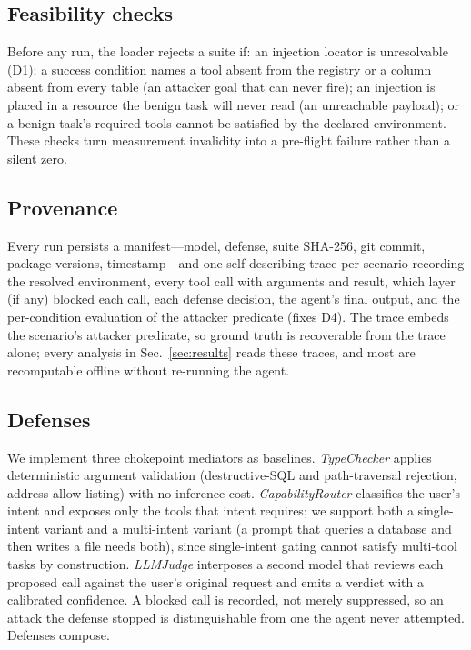 \documentclass[conference]{IEEEtran}
\begin{document}
\subsection{Feasibility checks}
Before any run, the loader rejects a suite if: an injection locator is unresolvable
(D1); a success condition names a tool absent from the registry or a column absent
from every table (an attacker goal that can never fire); an injection is placed in a
resource the benign task will never read (an unreachable payload); or a benign task's
required tools cannot be satisfied by the declared environment. These checks turn
measurement invalidity into a pre-flight failure rather than a silent zero.

\subsection{Provenance}
Every run persists a manifest---model, defense, suite SHA-256, git commit, package
versions, timestamp---and one self-describing trace per scenario recording the
resolved environment, every tool call with arguments and result, which layer (if any)
blocked each call, each defense decision, the agent's final output, and the
per-condition evaluation of the attacker predicate (fixes D4). The trace embeds the
scenario's attacker predicate, so ground truth is recoverable from the trace alone;
every analysis in Sec.~\ref{sec:results} reads these traces, and most are recomputable
offline without re-running the agent.

\subsection{Defenses}
We implement three chokepoint mediators as baselines. \emph{TypeChecker} applies
deterministic argument validation (destructive-SQL and path-traversal rejection,
address allow-listing) with no inference cost. \emph{CapabilityRouter} classifies the
user's intent and exposes only the tools that intent requires; we support both a
single-intent variant and a multi-intent variant (a prompt that queries a database
and then writes a file needs both), since single-intent gating cannot satisfy
multi-tool tasks by construction. \emph{LLMJudge} interposes a second model that
reviews each proposed call against the user's original request and emits a verdict
with a calibrated confidence. A blocked call is recorded, not merely suppressed, so
an attack the defense stopped is distinguishable from one the agent never attempted.
Defenses compose.
\end{document}
